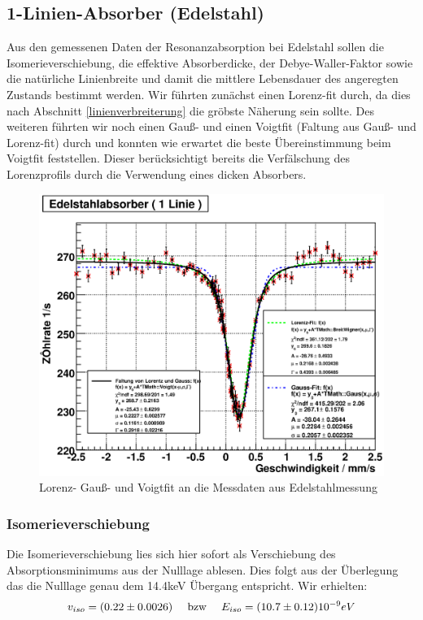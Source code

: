 \documentclass[12pt]{article}
\begin{document}
\subsection{1-Linien-Absorber (Edelstahl)}
Aus den gemessenen Daten der Resonanzabsorption bei Edelstahl sollen die Isomerieverschiebung, die effektive Absorberdicke, der Debye-Waller-Faktor
sowie die natürliche Linienbreite und damit die mittlere Lebensdauer des angeregten Zustands bestimmt werden. Wir führten zunächst einen Lorenz-fit
durch, da dies nach Abschnitt \ref{linienverbreiterung} die gröbste Näherung sein sollte. Des weiteren führten wir noch einen Gauß- und einen Voigtfit
(Faltung aus Gauß- und Lorenz-fit) durch und konnten wie erwartet die beste Übereinstimmung beim Voigtfit feststellen. Dieser berücksichtigt bereits 
die Verfälschung des Lorenzprofils durch die Verwendung eines dicken Absorbers.
\begin{figure}[H]
 \includegraphics[width=0.9\linewidth]{pictures/stahl.eps}
 \caption{Lorenz- Gauß- und Voigtfit an die Messdaten aus Edelstahlmessung}
\end{figure}

\subsubsection{Isomerieverschiebung}
Die Isomerieverschiebung lies sich hier sofort als Verschiebung des Absorptionsminimums aus der Nulllage ablesen. Dies folgt aus der Überlegung das 
die Nulllage genau dem 14.4keV Übergang entspricht. Wir erhielten:
\begin{align*}
 v_{iso} = (0.22\pm 0.0026) \hspace{10pt} \textnormal{ bzw } \hspace{10pt} E_{iso} = (10.7 \pm 0.12) 10^{-9} eV
\end{align*}
\end{document}
